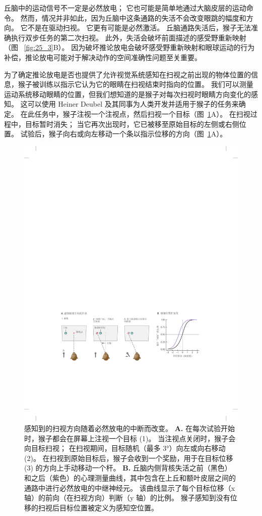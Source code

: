 丘脑中的运动信号不一定是必然放电；
它也可能是简单地通过大脑皮层的运动命令。
然而，情况并非如此，因为丘脑中这条通路的失活不会改变眼跳的幅度和方向。
它不是在驱动扫视。
它更有可能是必然激活。
丘脑通路失活后，猴子无法准确执行双步任务的第二次扫视。
此外，失活会破坏前面描述的感受野重新映射（图 ~\ref{fig:25_3}B）。
因为破坏推论放电会破坏感受野重新映射和眼球运动的行为补偿，推论放电可能对于解决动作的空间准确性问题至关重要。


为了确定推论放电是否也提供了允许视觉系统感知在扫视之前出现的物体位置的信息，猴子被训练以指示它认为它的眼睛在扫视结束时指向的位置。
我们可以测量运动系统移动眼睛的位置，但我们想知道的是猴子对每次扫视时眼睛方向变化的感知。
这可以使用 Heiner Deubel 及其同事为人类开发并适用于猴子的任务来确定。
在此任务中，猴子注视一个注视点，然后扫视一个目标（图~\ref{fig:25_5}A）。
在扫视过程中，目标暂时消失；
当它再次出现时，它已被移至原始目标的左侧或右侧位置。
试验后，猴子向右或向左移动一个条以指示位移的方向（图~\ref{fig:25_5}A）。


\begin{figure}[htbp]
	\centering
	\includegraphics[width=0.8\linewidth]{chap25/fig_25_5}
	\caption{感知到的扫视方向随着必然放电的中断而改变。
		\textbf{A.} 在每次试验开始时，猴子都会在屏幕上注视一个目标 (1)。
		当注视点关闭时，猴子会向目标扫视；
		在扫视期间，目标随机（最多 3°）向左或向右移动 (2)。
		在扫视到原始目标后，猴子会收到一个奖励，用于在目标位移 (3) 的方向上手动移动一个杆。
		\textbf{B.} 丘脑内侧背核失活之前（黑色）和之后（紫色）的心理测量曲线，其中包含在上丘和额叶皮层之间的通路中进行必然放电的中继神经元。
		该曲线显示了每个目标位移（x 轴）的前向（在扫视方向）判断（y 轴）的比例。
		猴子感知到没有位移的扫视后目标位置被定义为感知空位置\cite{cavanaugh2016saccadic}。}
	\label{fig:25_5}
\end{figure}


